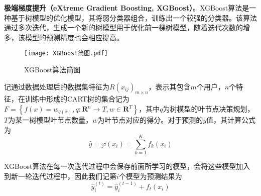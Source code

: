 \documentclass{MathorCupModeling}
\begin{document}
	\textbf{极端梯度提升（eXtreme Gradient Boosting, XGBoost）}。XGBoost算法是一种基于树模型的优化模型，其将弱分类器组合，训练出一个较强的分类器。该算法通过多次迭代，生成一个新的树模型用于优化前一棵树模型，随着迭代次数的增多，该模型的预测精度也会相应提高\textcolor{blue}{\cite{pxgboost1}}。
	\begin{figure}[H]
		\centerline{\texttt{[image: XGBoost简图.pdf]}}
		\caption{XGBoost算法简图}\label{fig:XGBoost}
	\end{figure}
		记通过数据处理后的数据集特征为$R\left(x_{ij}\right)_{m\times n}$，表示其包含$m$个用户，$n$个特征，在训练中形成的CART树的集合记为$F=\left\{f\left(x\right)=w_{q\left(x\right)},q:\mathbf{R}^n\to T,w\in \mathbf{R}^T\right\}$，其中$q$为树模型的叶节点决策规划，$T$为某一树模型叶节点数量，$w$为叶节点对应的得分\textcolor{blue}{\cite{pxgboost2}}。对于预测的$y$值，其计算公式为
		\begin{equation}
			\hat{y}=\varphi \left( x_i \right) =\sum\limits_{k=1}^K{f_k\left( x_i \right)} \label{fXGBoostypre}
		\end{equation}
	
		XGBoost算法在每一次迭代过程中会保存前面所学习的模型，会将这些模型加入到新一轮迭代过程中，因此我们记第$i$个模型为预测结果为
		\begin{equation}
			\hat{y}_{i}^{\left(t\right)}=\hat{y}_{i}^{\left(t-1\right)}+f_t\left(x_i\right) \label{fXGBoostyprei}
		\end{equation}
		
\end{document}
